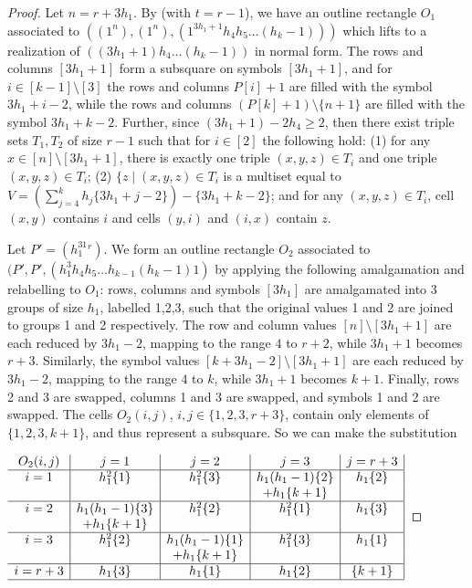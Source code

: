 \documentclass[10pt,a4paper]{amsart}
\begin{document}
\begin{proof}
    Let $n=r+3h_1$.
By  (with $t=r-1$), we have an outline rectangle $O_1$ associated to $((1^n), (1^n), (1^{3h_1+1}h_4h_5\dots (h_k-1)))$ which lifts to a realization of $((3h_1+1)h_4\dots (h_k-1))$ in normal form. The rows and columns $[3h_1+1]$ form a subsquare on symbols $[3h_1+1]$, and for $i\in [k-1] \setminus [3]$ the rows and columns $P[i]+1$ are filled with the symbol $3h_1+i-2$, while the rows and columns $(P[k]+1)\setminus \{n+1\}$ are filled with the symbol $3h_1+k-2$.
Further, since $(3h_1+1)-2h_4 \ge 2$, then there exist triple sets $T_1, T_2$ of size $r-1$ such that for $i\in [2]$ the following hold: (1) for any $x\in [n]\setminus [3h_1+1]$, there is exactly one triple $(x,y,z) \in T_i$ and one triple $(x,y,z) \in T_i$; (2) $\{z \mid (x,y,z) \in T_i$ is a multiset equal to $V= \left(\sum_{j=4}^{k} h_j \{3h_1+j-2\}\right)-\{3h_1+k-2\}$; and for any $(x,y,z) \in T_i$, cell $(x,y)$ contains $i$ and cells $(y,i)$ and $(i,x)$ contain $z$. 

    Let $P' = (h_1^31^r)$. We form an outline rectangle $O_2$ associated to $(P',P',(h_1^3 h_4h_5\dots h_{k-1}(h_k-1)1)$ by applying the following amalgamation and relabelling to $O_1$: rows, columns and symbols $[3h_1]$ are amalgamated into 3 groups of size $h_1$, labelled 1,2,3, such that the original values 1 and 2 are joined to groups 1 and 2 respectively. The row and column values $[n] \setminus [3h_1+1]$ are each reduced by $3h_1-2$, mapping to the range $4$ to $r+2$, while $3h_1+1$ becomes $r+3$. Similarly, the symbol values $[k+3h_1-2] \setminus [3h_1+1]$ are each reduced by $3h_1-2$, mapping to the range $4$ to $k$, while $3h_1+1$ becomes $k+1$.
    Finally, rows 2 and 3 are swapped, columns 1 and 3 are swapped, and symbols 1 and 2 are swapped. 
    The cells $O_2(i,j)$, $i,j \in \{1,2,3,r+3\}$, contain only elements of $\{1,2,3,k+1\}$, and thus represent a subsquare. So we can make the substitution 
\newline

    $\begin{array}{c|c|c|c|c|}
O_2(i,j) & j=1 & j=2 & j=3 & j=r+3 \\ 
\hline
i=1 & h_1^2 \{1\} & h_1^2\{3\} & h_1(h_1-1)\{2\} & h_1\{2\} \\
&&&+h_1\{k+1\}& \\
\hline
i=2 & h_1(h_1-1)\{3\} & h_1^2\{2\} & h_1^2 \{1\} & h_1\{3\} \\
&+h_1\{k+1\}&&& \\
\hline
i=3 & h_1^2\{2\} & h_1(h_1-1)\{1\} & h_1^2\{3\} & h_1\{1\} \\
&&+h_1\{k+1\}&& \\
\hline
i=r+3 & h_1\{3\} & h_1\{1\} & h_1\{2\} & \{k+1\} \\
\hline
\end{array}$
\newline


\end{proof}
\end{document}
